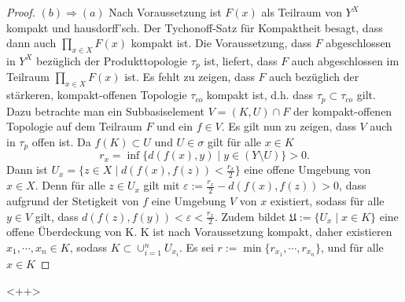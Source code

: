 \begin{proof}
  $(b) \Rightarrow (a)$
  Nach Voraussetzung ist $F(x)$ als Teilraum von $Y^X$ kompakt und hausdorff'sch.
  Der Tychonoff-Satz für Kompaktheit besagt, dass dann auch $\prod_{x \in X} F(x)$ kompakt ist.
  Die Voraussetzung, dass $F$ abgeschlossen in $Y^X$ bezüglich der Produkttopologie $\tau_p$ ist, liefert, dass $F$ auch abgeschlossen im Teilraum $\prod_{x \in X} F(x)$ ist.
  Es fehlt zu zeigen, dass $F$ auch bezüglich der stärkeren, kompakt-offenen Topologie $\tau_{co}$ kompakt ist, d.h. dass $\tau_p \subset \tau_{co}$ gilt.
  Dazu betrachte man ein Subbasiselement $V = (K,U) \cap F$ der kompakt-offenen Topologie auf dem Teilraum $F$ und ein $f \in V$.
  Es gilt nun zu zeigen, dass $V$ auch in $\tau_p$ offen ist.
  Da $f(K) \subset U$ und $U \in \sigma$ gilt für alle $x \in K$
  \begin{displaymath}
    r_x = \inf\{d(f(x),y) \mid y \in (Y \setminus U) \} > 0.
  \end{displaymath}
  Dann ist $U_x = \{ z \in X \mid d(f(x),f(z)) < \tfrac{r_x}{2}\}$ eine offene Umgebung von $x \in X$.
  Denn für alle $z \in U_x$ gilt mit $\varepsilon := \tfrac{r_x}{2} - d(f(x),f(z)) > 0$, dass aufgrund der Stetigkeit von $f$ eine Umgebung $V$ von $x$ existiert, sodass für alle $y \in V$ gilt, dass $d(f(z),f(y)) < \varepsilon < \tfrac{r_x}{2}$.
  Zudem bildet $\mathfrak{U} := \{U_x \mid x \in K\}$ eine offene Überdeckung von K. 
  K ist nach Voraussetzung kompakt, daher existieren $x_1,\cdots,x_n \in K$, sodass $K \subset \cup_{i=1}^n U_{x_i}$.
  Es sei $r:= \min\{r_{x_1},\cdots,r_{x_n}\}$, und für alle $x \in K$

\end{proof}<++>
